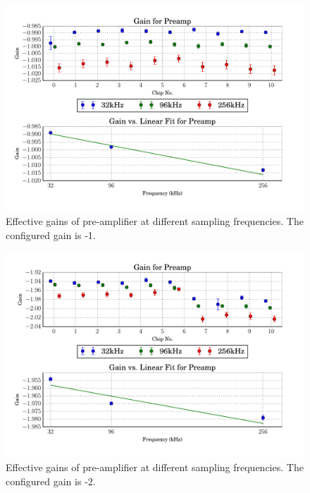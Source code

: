 \begin{figure}
    \centering
    \includegraphics[width=0.95\linewidth]{images/plots/dc_slope_preamp_gain-1.pdf}
    \caption{Effective gains of pre-amplifier at different sampling frequencies. The configured gain is -1.}
    \label{fig:preamp_slope-1}
\end{figure}
\begin{figure}
    \centering
    \includegraphics[width=0.95\linewidth]{images/plots/dc_slope_preamp_gain-2.pdf}
    \caption{Effective gains of pre-amplifier at different sampling frequencies. The configured gain is -2.}
    \label{fig:preamp_slope-2}
\end{figure}
